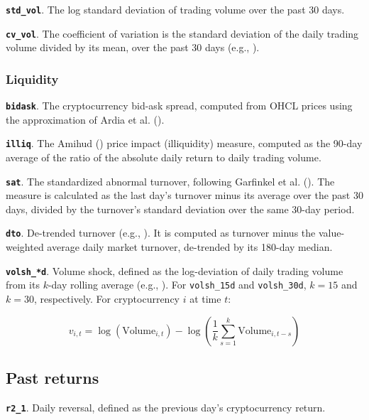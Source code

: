 \documentclass[
  12pt,
  a4paper,
  openany]{scrbook}
\begin{document}
\textbf{\texttt{std\_vol}}. The log standard deviation of trading volume
over the past 30 days.

\textbf{\texttt{cv\_vol}}. The coefficient of variation is the standard
deviation of the daily trading volume divided by its mean, over the past
30 days (e.g., ).

\subsubsection{Liquidity}\label{liquidity}

\textbf{\texttt{bidask}}. The cryptocurrency bid-ask spread, computed
from OHCL prices using the approximation of Ardia et al.
().

\textbf{\texttt{illiq}}. The Amihud
() price impact
(illiquidity) measure, computed as the 90-day average of the ratio of
the absolute daily return to daily trading volume.

\textbf{\texttt{sat}}. The standardized abnormal turnover, following
Garfinkel et al. ().
The measure is calculated as the last day's turnover minus its average
over the past 30 days, divided by the turnover's standard deviation over
the same 30-day period.

\textbf{\texttt{dto}}. De-trended turnover (e.g.,
). It is
computed as turnover minus the value-weighted average daily market
turnover, de-trended by its 180-day median.

\textbf{\texttt{volsh\_*d}}. Volume shock, defined as the log-deviation
of daily trading volume from its \(k\)-day rolling average (e.g.,
).
For \texttt{volsh\_15d} and \texttt{volsh\_30d}, \(k = 15\) and
\(k = 30\), respectively. For cryptocurrency \(i\) at time \(t\):

\[
v_{i,t} = \log(\text{Volume}_{i,t}) - \log\left( \frac{1}{k} \sum_{s=1}^{k} \text{Volume}_{i,t-s} \right)
\]

\subsection{Past returns}\label{past-returns}

\textbf{\texttt{r2\_1}}. Daily reversal, defined as the previous day's
cryptocurrency return.
\end{document}
